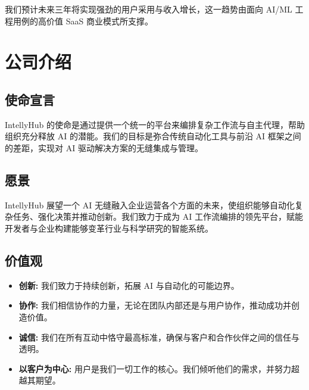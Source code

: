 \documentclass[11pt, a4paper, oneside]{article}
\begin{document}
我们预计未来三年将实现强劲的用户采用与收入增长，这一趋势由面向 AI/ML 工程用例的高价值 SaaS 商业模式所支撑。

\section{公司介绍}
\subsection{使命宣言}
IntellyHub 的使命是通过提供一个统一的平台来编排复杂工作流与自主代理，帮助组织充分释放 AI 的潜能。我们的目标是弥合传统自动化工具与前沿 AI 框架之间的差距，实现对 AI 驱动解决方案的无缝集成与管理。

\subsection{愿景}
IntellyHub 展望一个 AI 无缝融入企业运营各个方面的未来，使组织能够自动化复杂任务、强化决策并推动创新。我们致力于成为 AI 工作流编排的领先平台，赋能开发者与企业构建能够变革行业与科学研究的智能系统。

\subsection{价值观}
\begin{itemize}
    \item \textbf{创新:} 我们致力于持续创新，拓展 AI 与自动化的可能边界。
    \item \textbf{协作:} 我们相信协作的力量，无论在团队内部还是与用户协作，推动成功并创造价值。
    \item \textbf{诚信:} 我们在所有互动中恪守最高标准，确保与客户和合作伙伴之间的信任与透明。
    \item \textbf{以客户为中心:} 用户是我们一切工作的核心。我们倾听他们的需求，并努力超越其期望。



\end{itemize}
\end{document}
